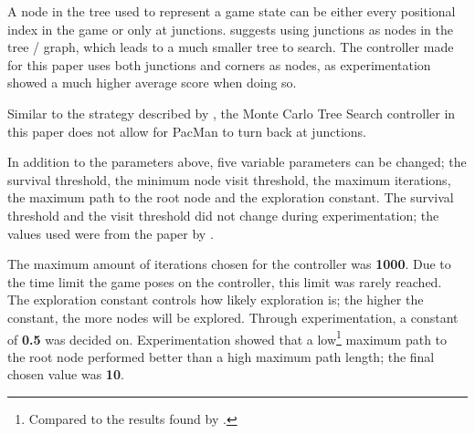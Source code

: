 A node in the tree used to represent a game state can be either every positional index in the game or only at junctions. \citet{pepels2012enhancements} suggests using junctions as nodes in the tree / graph, which leads to a much smaller tree to search. The controller made for this paper uses both junctions and corners as nodes, as experimentation showed a much higher average score when doing so.

Similar to the strategy described by \cite{pepels2012enhancements}, the Monte Carlo Tree Search controller in this paper does not allow for PacMan to turn back at junctions.

In addition to the parameters above, five variable parameters can be changed; the survival threshold, the minimum node visit threshold, the maximum iterations, the maximum path to the root node and the exploration constant. The survival threshold and the visit threshold did not change during experimentation; the values used were from the paper by \citet{pepels2012enhancements}.

The maximum amount of iterations chosen for the controller was \textbf{1000}. Due to the time limit the game poses on the controller, this limit was rarely reached. The exploration constant controls how likely exploration is; the higher the constant, the more nodes will be explored. Through experimentation, a constant of \textbf{0.5} was decided on. Experimentation showed that a low\footnote{Compared to the results found by \citet{pepels2012enhancements}.} maximum path to the root node performed better than a high maximum path length; the final chosen value was \textbf{10}.